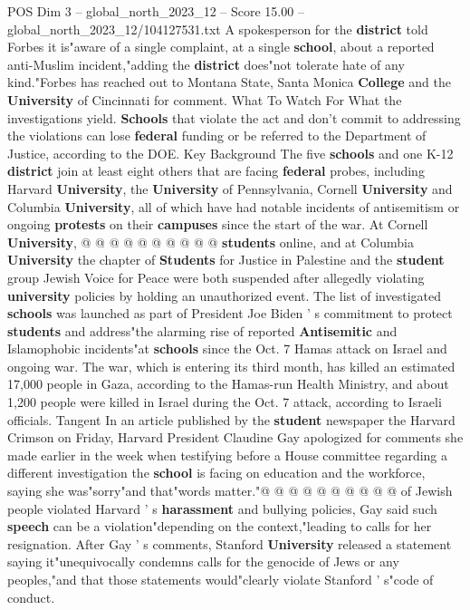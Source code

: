 \begin{textsample}{POS Dim 3 – global\_north\_2023\_12 – Score 15.00 – global\_north\_2023\_12/104127531.txt}
A spokesperson for the \textbf{district} told Forbes it is"aware of a single complaint, at a single \textbf{school}, about a reported anti-Muslim incident,"adding the \textbf{district} does"not tolerate hate of any kind."Forbes has reached out to Montana State, Santa Monica \textbf{College} and the \textbf{University} of Cincinnati for comment.
What To Watch For What the investigations yield. \textbf{Schools} that violate the act and don't commit to addressing the violations can lose \textbf{federal} funding or be referred to the Department of Justice, according to the DOE.
Key Background The five \textbf{schools} and one K-12 \textbf{district} join at least eight others that are facing \textbf{federal} probes, including Harvard \textbf{University}, the \textbf{University} of Pennsylvania, Cornell \textbf{University} and Columbia \textbf{University}, all of which have had notable incidents of antisemitism or ongoing \textbf{protests} on their \textbf{campuses} since the start of the war.
At Cornell \textbf{University}, @ @ @ @ @ @ @ @ @ @ \textbf{students} online, and at Columbia \textbf{University} the chapter of \textbf{Students} for Justice in Palestine and the \textbf{student} group Jewish Voice for Peace were both suspended after allegedly violating \textbf{university} policies by holding an unauthorized event.
The list of investigated \textbf{schools} was launched as part of President Joe Biden ' s commitment to protect \textbf{students} and address"the alarming rise of reported \textbf{Antisemitic} and Islamophobic incidents"at \textbf{schools} since the Oct. 7 Hamas attack on Israel and ongoing war.
The war, which is entering its third month, has killed an estimated 17,000 people in Gaza, according to the Hamas-run Health Ministry, and about 1,200 people were killed in Israel during the Oct. 7 attack, according to Israeli officials.
Tangent In an article published by the \textbf{student} newspaper the Harvard Crimson on Friday, Harvard President Claudine Gay apologized for comments she made earlier in the week when testifying before a House committee regarding a different investigation the \textbf{school} is facing on education and the workforce, saying she was"sorry"and that"words matter."@ @ @ @ @ @ @ @ @ @ of Jewish people violated Harvard ' s \textbf{harassment} and bullying policies, Gay said such \textbf{speech} can be a violation"depending on the context,"leading to calls for her resignation.
After Gay ' s comments, Stanford \textbf{University} released a statement saying it"unequivocally condemns calls for the genocide of Jews or any peoples,"and that those statements would"clearly violate Stanford ' s"code of conduct.

\end{textsample}
